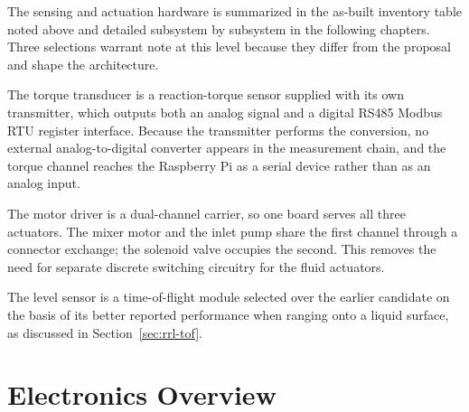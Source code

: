 
The sensing and actuation hardware is summarized in the as-built inventory table noted above and detailed subsystem by subsystem in the following chapters. Three selections warrant note at this level because they differ from the proposal and shape the architecture.

The torque transducer is a reaction-torque sensor supplied with its own transmitter, which outputs both an analog signal and a digital RS485 Modbus RTU register interface. Because the transmitter performs the conversion, no external analog-to-digital converter appears in the measurement chain, and the torque channel reaches the Raspberry Pi as a serial device rather than as an analog input.

The motor driver is a dual-channel carrier, so one board serves all three actuators. The mixer motor and the inlet pump share the first channel through a connector exchange; the solenoid valve occupies the second. This removes the need for separate discrete switching circuitry for the fluid actuators.

The level sensor is a time-of-flight module selected over the earlier candidate on the basis of its better reported performance when ranging onto a liquid surface, as discussed in Section~\ref{sec:rrl-tof}.


\section{Electronics Overview}
\label{sec:arch-electronics}



